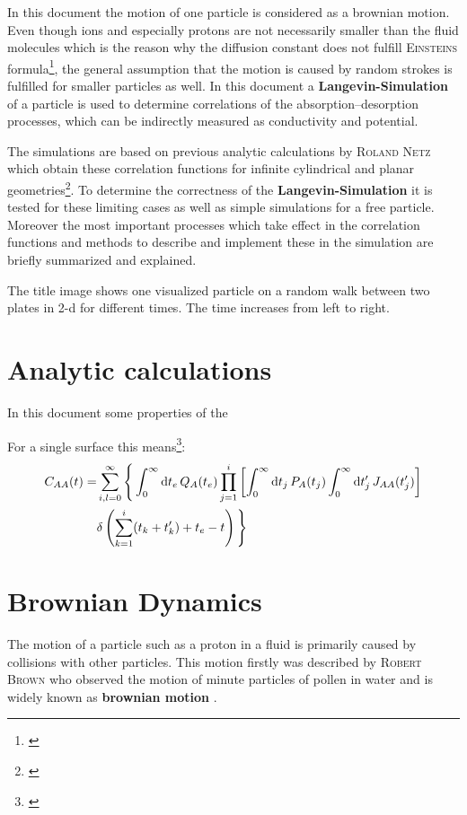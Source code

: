 \documentclass[a4paper, parskip=half]{scrartcl}
\newcommand{\person}[1]{%
	\textsc{#1}%
}
\newcommand{\effect}[1]{%
	\textbf{#1}%
}
\newcommand{\diff}{\mathop{}\!\mathrm{d}}
\newcommand{\myCite}[1]{\footnote{\cite{#1} \citeauthor{#1} \citetitle{#1} \citeyear{#1}}}
\begin{document}
In this document the motion of one particle is considered as a brownian motion. Even though ions and especially protons are not necessarily smaller than the fluid molecules which is the reason why the diffusion constant does not fulfill \person{Einsteins} formula\myCite{brownian}, the general assumption that the motion is caused by random strokes is fulfilled for smaller particles as well. In this document a \effect{Langevin-Simulation} of a particle is used to determine correlations of the absorption--desorption processes, which can be indirectly measured as conductivity and potential.

The simulations are based on previous analytic calculations by \person{Roland Netz} which obtain these correlation functions for infinite cylindrical and planar geometries\myCite{netzpaper}. To determine the correctness of the \effect{Langevin-Simulation} it is tested for these limiting cases as well as simple simulations for a free particle. Moreover the most important processes which take effect in the correlation functions and methods to describe and implement these in the simulation are briefly summarized and explained.

The title image shows one visualized particle on a random walk between two plates in 2-d for different times. The time increases from left to right. 

\newpage
\section{Analytic calculations}
In this document some properties of the 

For a single surface this means\myCite{netzpaper}:
\begin{align}
C_{AA}(t) = &\sum_{i,l=0}^\infty \Bigg\lbrace \int_0^\infty \diff t_e\, Q_A(t_e) \prod_{j=1}^i \left[ \int_0^\infty \diff t_j\, P_A(t_j) \int_0^\infty \diff t_j'\, J_{AA}(t_j')\right]\notag\\ 
&\delta \left(\sum_{k=1}^i(t_k+t_k') + t_e - t \right) \Bigg\rbrace
\end{align}

\newpage
\section{Brownian Dynamics}
The motion of a particle such as a proton in a fluid is primarily  caused by collisions with other particles. This motion firstly was described by \person{Robert Brown} who observed the motion of minute particles of pollen in water and is widely known as \effect{brownian motion}.
\end{document}
